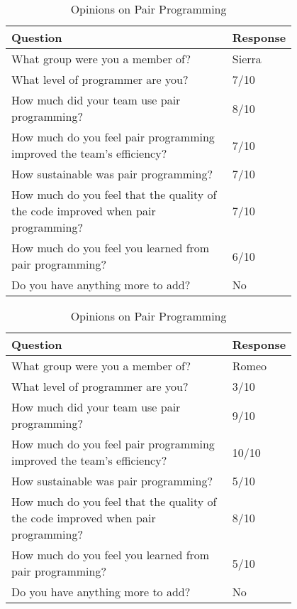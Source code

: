\documentclass{article}
\begin{document}
\begin{table}[ht]
\centering
\renewcommand{\arraystretch}{1.3}
\caption{Opinions on Pair Programming}
\begin{tabular}{|p{0.8\linewidth}|l|}
\hline
\textbf{Question} & \textbf{Response} \\
\hline
What group were you a member of? & Sierra \\
\hline 
What level of programmer are you? & 7/10\\
\hline 
How much did your team use pair programming? & 8/10\\
\hline 
How much do you feel pair programming improved the team's efficiency? & 7/10\\
\hline 
How sustainable was pair programming? & 7/10\\
\hline 
How much do you feel that the quality of the code improved when pair programming? & 7/10\\
\hline 
How much do you feel you learned from pair programming? & 6/10\\
\hline 
Do you have anything more to add? &  No\\
\hline
\end{tabular}
\end{table}

\begin{table}[ht]
\centering
\renewcommand{\arraystretch}{1.3}
\caption{Opinions on Pair Programming}
\begin{tabular}{|p{0.8\linewidth}|l|}
\hline
\textbf{Question} & \textbf{Response} \\
\hline
What group were you a member of? & Romeo \\
\hline 
What level of programmer are you? & 3/10\\
\hline 
How much did your team use pair programming? & 9/10\\
\hline 
How much do you feel pair programming improved the team's efficiency? & 10/10\\
\hline 
How sustainable was pair programming? & 5/10\\
\hline 
How much do you feel that the quality of the code improved when pair programming? & 8/10\\
\hline 
How much do you feel you learned from pair programming? & 5/10\\
\hline 
Do you have anything more to add? &  No\\
\hline
\end{tabular}
\end{table}
\end{document}
